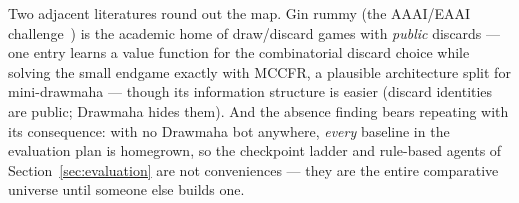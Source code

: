 Two adjacent literatures round out the map. Gin rummy (the AAAI/EAAI challenge~\cite{ginrummy}) is the academic home of draw/discard games with \emph{public} discards --- one entry learns a value function for the combinatorial discard choice while solving the small endgame exactly with MCCFR, a plausible architecture split for mini-drawmaha --- though its information structure is easier (discard identities are public; Drawmaha hides them). And the absence finding bears repeating with its consequence: with no Drawmaha bot anywhere, \emph{every} baseline in the evaluation plan is homegrown, so the checkpoint ladder and rule-based agents of Section~\ref{sec:evaluation} are not conveniences --- they are the entire comparative universe until someone else builds one.
